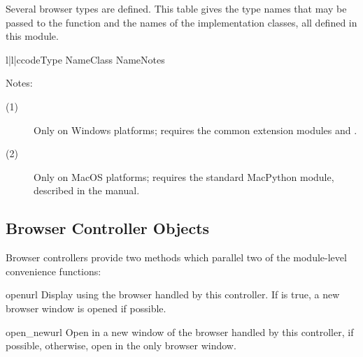Several browser types are defined.  This table gives the type names
that may be passed to the  function and the names of
the implementation classes, all defined in this module.

\begin{tableiii}{l|l|c}{code}{Type Name}{Class Name}{Notes}
\end{tableiii}

\noindent
Notes:

\begin{description}
\item[(1)]
Only on Windows platforms; requires the common
extension modules  and .

\item[(2)]
Only on MacOS platforms; requires the standard MacPython 
module, described in the  manual.
\end{description}


\subsection{Browser Controller Objects \label{browser-controllers}}

Browser controllers provide two methods which parallel two of the
module-level convenience functions:

\begin{funcdesc}{open}{url}
  Display  using the browser handled by this controller.  If
   is true, a new browser window is opened if possible.
\end{funcdesc}

\begin{funcdesc}{open_new}{url}
  Open  in a new window of the browser handled by this
  controller, if possible, otherwise, open  in the only
  browser window.
\end{funcdesc}
